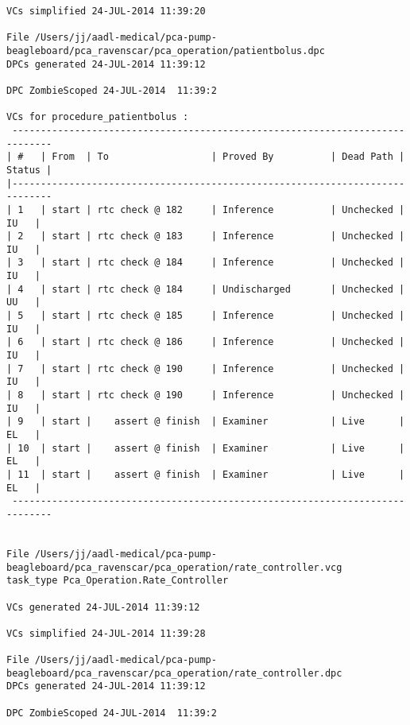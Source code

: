 \begin{lstlisting}[frame=single, gobble=0, caption={POGS report for PCA Pump prototype}]
VCs simplified 24-JUL-2014 11:39:20

File /Users/jj/aadl-medical/pca-pump-beagleboard/pca_ravenscar/pca_operation/patientbolus.dpc
DPCs generated 24-JUL-2014 11:39:12

DPC ZombieScoped 24-JUL-2014  11:39:2

VCs for procedure_patientbolus :
 -----------------------------------------------------------------------------
| #   | From  | To                  | Proved By          | Dead Path | Status |
|-----------------------------------------------------------------------------
| 1   | start | rtc check @ 182     | Inference          | Unchecked |   IU   |
| 2   | start | rtc check @ 183     | Inference          | Unchecked |   IU   |
| 3   | start | rtc check @ 184     | Inference          | Unchecked |   IU   |
| 4   | start | rtc check @ 184     | Undischarged       | Unchecked |   UU   |
| 5   | start | rtc check @ 185     | Inference          | Unchecked |   IU   |
| 6   | start | rtc check @ 186     | Inference          | Unchecked |   IU   |
| 7   | start | rtc check @ 190     | Inference          | Unchecked |   IU   |
| 8   | start | rtc check @ 190     | Inference          | Unchecked |   IU   |
| 9   | start |    assert @ finish  | Examiner           | Live      |   EL   |
| 10  | start |    assert @ finish  | Examiner           | Live      |   EL   |
| 11  | start |    assert @ finish  | Examiner           | Live      |   EL   |
 -----------------------------------------------------------------------------


File /Users/jj/aadl-medical/pca-pump-beagleboard/pca_ravenscar/pca_operation/rate_controller.vcg
task_type Pca_Operation.Rate_Controller

VCs generated 24-JUL-2014 11:39:12

VCs simplified 24-JUL-2014 11:39:28

File /Users/jj/aadl-medical/pca-pump-beagleboard/pca_ravenscar/pca_operation/rate_controller.dpc
DPCs generated 24-JUL-2014 11:39:12

DPC ZombieScoped 24-JUL-2014  11:39:2


\end{lstlisting}
